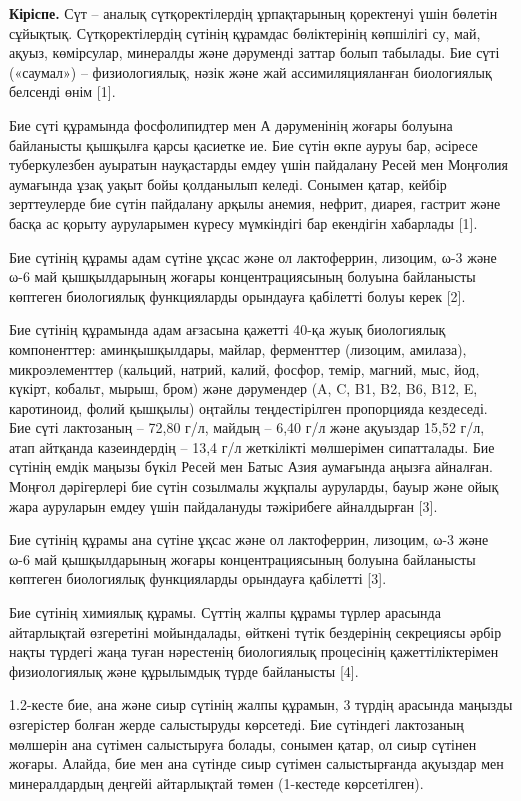 \begin{multicols}{2}
{\bfseries Кіріспе.} Сүт -- аналық сүтқоректілердің ұрпақтарының қоректенуі
үшін бөлетін сұйықтық. Сүтқоректілердің сүтінің құрамдас бөліктерінің
көпшілігі су, май, ақуыз, көмірсулар, минералды және дәруменді заттар
болып табылады. Бие сүті («саумал») -- физиологиялық, нәзік және жай
ассимиляцияланған биологиялық белсенді өнім {[}1{]}.

Бие сүті құрамында фосфолипидтер мен А дәруменінің жоғары болуына
байланысты қышқылға қарсы қасиетке ие. Бие сүтін өкпе ауруы бар, әсіресе
туберкулезбен ауыратын науқастарды емдеу үшін пайдалану Ресей мен
Моңғолия аумағында ұзақ уақыт бойы қолданылып келеді. Сонымен қатар,
кейбір зерттеулерде бие сүтін пайдалану арқылы анемия, нефрит, диарея,
гастрит және басқа ас қорыту ауруларымен күресу мүмкіндігі бар екендігін
хабарлады {[}1{]}.

Бие сүтінің құрамы адам сүтіне ұқсас және ол лактоферрин, лизоцим, ω-3
және ω-6 май қышқылдарының жоғары концентрациясының болуына байланысты
көптеген биологиялық функцияларды орындауға қабілетті болуы керек
{[}2{]}.

Бие сүтінің құрамында адам ағзасына қажетті 40-қа жуық биологиялық
компоненттер: аминқышқылдары, майлар, ферменттер (лизоцим, амилаза),
микроэлементтер (кальций, натрий, калий, фосфор, темір, магний, мыс,
йод, күкірт, кобальт, мырыш, бром) және дәрумендер (A, C, B1, B2, B6,
B12, E, каротиноид, фолий қышқылы) оңтайлы теңдестірілген пропорцияда
кездеседі. Бие сүті лактозаның -- 72,80 г/л, майдың -- 6,40 г/л және
ақуыздар 15,52 г/л, атап айтқанда казеиндердің -- 13,4 г/л жеткілікті
мөлшерімен сипатталады. Бие сүтінің емдік маңызы бүкіл Ресей мен Батыс
Азия аумағында аңызға айналған. Моңғол дәрігерлері бие сүтін созылмалы
жұқпалы ауруларды, бауыр және ойық жара ауруларын емдеу үшін пайдалануды
тәжірибеге айналдырған {[}3{]}.

Бие сүтінің құрамы ана сүтіне ұқсас және ол лактоферрин, лизоцим, ω-3
және ω-6 май қышқылдарының жоғары концентрациясының болуына байланысты
көптеген биологиялық функцияларды орындауға қабілетті {[}3{]}.

Бие сүтінің химиялық құрамы. Сүттің жалпы құрамы түрлер арасында
айтарлықтай өзгеретіні мойындалады, өйткені түтік бездерінің секрециясы
әрбір нақты түрдегі жаңа туған нәрестенің биологиялық процесінің
қажеттіліктерімен физиологиялық және құрылымдық түрде байланысты
{[}4{]}.

1.2-кесте бие, ана және сиыр сүтінің жалпы құрамын, 3 түрдің арасында
маңызды өзгерістер болған жерде салыстыруды көрсетеді. Бие сүтіндегі
лактозаның мөлшерін ана сүтімен салыстыруға болады, сонымен қатар, ол
сиыр сүтінен жоғары. Алайда, бие мен ана сүтінде сиыр сүтімен
салыстырғанда ақуыздар мен минералдардың деңгейі айтарлықтай төмен
(1-кестеде көрсетілген).
\end{multicols}

